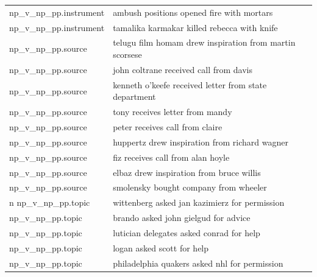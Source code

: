 \begin{table}[h]
\begin{tabular}{ll}
np\_v\_np\_pp.instrument &	ambush positions	opened	fire	with	mortars	 \\
np\_v\_np\_pp.instrument &	tamalika karmakar	killed	rebecca	with	knife	 \\
np\_v\_np\_pp.source & telugu film homam	drew	inspiration	from	martin scorsese \\
np\_v\_np\_pp.source&	john coltrane	received	call	from	davis	 \\
np\_v\_np\_pp.source&	kenneth o'keefe	received	letter	from	state department	 \\
np\_v\_np\_pp.source&	tony	receives	letter	from	mandy	 \\
np\_v\_np\_pp.source&	peter	receives	call	from	claire	 \\
np\_v\_np\_pp.source&	huppertz	drew	inspiration	from	richard wagner	 \\
np\_v\_np\_pp.source&	fiz	receives	call	from	alan hoyle	 \\
np\_v\_np\_pp.source&	elbaz	drew	inspiration	from	bruce willis	 \\
np\_v\_np\_pp.source&	smolensky	bought	company	from	wheeler	 \\
n %
np\_v\_np\_pp.topic&	wittenberg	asked	jan kazimierz	for	permission	 \\
np\_v\_np\_pp.topic&	brando	asked	john gielgud	for	advice	 \\
np\_v\_np\_pp.topic&	lutician delegates	asked	conrad	for	help	 \\
np\_v\_np\_pp.topic&	logan	asked	scott	for	help	 \\
np\_v\_np\_pp.topic&	philadelphia quakers	asked	nhl	for	permission	 \\

\end{tabular}
\end{table}
